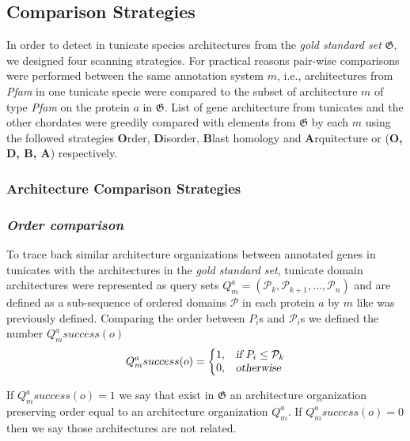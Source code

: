 \documentclass[11pt]{article}
\begin{document}
\subsection*{Comparison Strategies} \label{comparison}
In order to detect in tunicate species architectures from the \textsl{gold 
standard set} $\boldsymbol{\mathfrak{G}}$, we designed four scanning 
strategies. For practical reasons pair-wise comparisons were performed between 
the same annotation system $m$, i.e., architectures from \textsl{Pfam} in one 
tunicate specie were compared to the subset of architecture $m$ of type 
\textsl{Pfam} on the protein $a$ in $\boldsymbol{\mathfrak{G}}$. List of gene 
architecture from tunicates and the other chordates were greedily compared with 
elements from $\boldsymbol{\mathfrak{G}}$ by each $m$ using the followed 
strategies \textbf{O}rder, \textbf{D}isorder, \textbf{B}last homology and 
\textbf{A}rquitecture or (\textbf{O, D, B, A}) respectively.

\subsubsection*{Architecture Comparison Strategies}
\subsubsection*{\textit{\textbf{O}rder comparison}}

To trace back similar architecture organizations between annotated genes in 
tunicates with the architectures in the \textsl{gold standard set}, tunicate 
domain architectures were represented as query sets  $Q^{a}_{m} = 
(\mathcal{P}_k,\mathcal{P}_{k+1},\ldots,\mathcal{P}_n)$ and are defined as a 
sub-sequence of ordered domains $\mathcal{P}$ in each protein $a$ by $m$ like  
was previously defined. Comparing the order between $P_i$s and $\mathcal{P}_i$s 
we defined the number $Q^{a}_{m}{success(o)}$
\begin{equation}
  Q^a_{m}{success(o)}=\left\{
  \begin{array}{@{}ll@{}}
    1, & \textsl{if}\ P_{i} \leq \mathcal{P}_{k} \\
    0, & \textsl{otherwise}
  \end{array}\right.
\end{equation} 

If $Q^a_{m}{success(o)} = 1$ we say that exist in $\boldsymbol{\mathfrak{G}}$ 
an architecture organization preserving order equal to an architecture 
organization $Q^{a}_{m}$. If $Q^a_{m}{success(o)} = 0$ then we say those 
architectures are not related.
\end{document}

